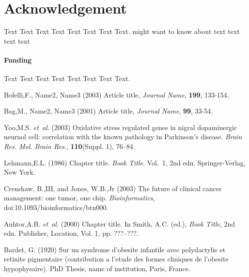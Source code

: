 \documentclass{bioinfo}
\begin{document}
\section*{Acknowledgement}
Text Text Text Text Text Text  Text Text.  \citealp{Boffelli03} might want to know about  text text text text

\paragraph{Funding\textcolon} Text Text Text Text Text Text  Text Text.

%
%
%
%
%
%
%
%
%


\begin{thebibliography}{}


 Bofelli,F., Name2, Name3 (2003) Article title, {\it Journal Name}, {\bf 199}, 133-154.

 Bag,M., Name2, Name3 (2001) Article title, {\it Journal Name}, {\bf 99}, 33-54.

Yoo,M.S. \textit{et~al}. (2003) Oxidative stress regulated genes
in nigral dopaminergic neurnol cell: correlation with the known
pathology in Parkinson's disease. \textit{Brain Res. Mol. Brain
Res.}, \textbf{110}(Suppl. 1), 76--84.

Lehmann,E.L. (1986) Chapter title. \textit{Book Title}. Vol.~1, 2nd edn. Springer-Verlag, New York.

Crenshaw, B.,III, and Jones, W.B.,Jr (2003) The future of clinical
cancer management: one tumor, one chip. \textit{Bioinformatics},
doi:10.1093/bioinformatics/btn000.

Auhtor,A.B. \textit{et~al}. (2000) Chapter title. In Smith, A.C.
(ed.), \textit{Book Title}, 2nd edn. Publisher, Location, Vol. 1, pp.
???--???.

Bardet, G. (1920) Sur un syndrome d'obesite infantile avec
polydactylie et retinite pigmentaire (contribution a l'etude des
formes cliniques de l'obesite hypophysaire). PhD Thesis, name of
institution, Paris, France.



\end{thebibliography}
\end{document}
